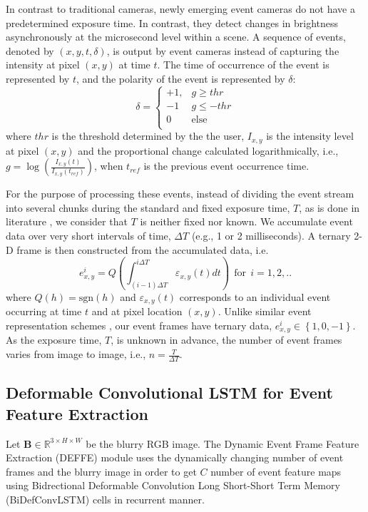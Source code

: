\documentclass{article}
\begin{document}
In contrast to traditional cameras, newly emerging event cameras do not have a predetermined exposure time. In contrast, they detect changes in brightness asynchronously at the microsecond level within a scene. A sequence of events, denoted by $\left(x,y,t,\delta\right)$, is output by event cameras instead of capturing the intensity at pixel $\left(x,y\right)$ at time $t$. The time of occurrence of the event is represented by $t$, and the polarity of the event is represented by $\delta$:
\[
  \delta  = \begin{cases}
      +1, & g \geq  thr \\
      -1 & g \leq -thr \\
      0 & \text{else} \\
  \end{cases}
\]
where $thr$ is the threshold determined by the the user, $I_{x,y}$ is the intensity level at pixel $\left(x,y\right)$ and the proportional change calculated logarithmically, i.e.,  $g =\log \left ( \frac{I_{x,y}\left ( t \right )}{I_{x,y}\left ( t_{ref}
\right )} \right ) $, when $t_{ref}$ is the previous event occurrence time.

For the purpose of processing these events, instead of dividing the event stream into several chunks during the standard and fixed exposure time, $T$, as is done in literature \cite{MADANet, EFNet}, we consider that $T$ is neither fixed nor known. We accumulate event data over very short intervals of time, $\Delta T$ (e.g., 1 or 2 milliseconds). A ternary 2-D frame is then constructed from the accumulated data, i.e. 
\begin{equation}
  e_{x,y}^i = Q\left(\int_{\left(i-1\right) \Delta T}^{i \Delta T} \varepsilon_{x,y}\left(t\right)dt\right) ~~ \text{for} ~~ i = 1, 2, ..
\end{equation}
where $Q(h) = \text{sgn}(h)$ and $\varepsilon_{x,y}\left(t\right)$ corresponds to an individual event occurring at time $t$ and at pixel location $(x,y)$. Unlike similar event representation schemes \cite{depthevent, opticalflow, tracking}, our event frames have ternary data, $e_{x,y}^i \in \left\{1,0,-1\right\}$. As the exposure time, $T$, is unknown in advance, the number of event frames varies from image to image, i.e., $n=\frac{T}{\Delta T}$.

\subsection{Deformable Convolutional LSTM for Event Feature Extraction}
Let $\mathbf{B} \in \mathbb{R}^{3 \times H \times W }$ be the blurry RGB image. The Dynamic Event Frame Feature Extraction (DEFFE)
module uses the dynamically changing number of event frames and the blurry image in order to get $C$ number of event feature maps using
Bidrectional Deformable Convolution Long Short-Short Term Memory (BiDefConvLSTM) cells in recurrent manner. 
\end{document}
